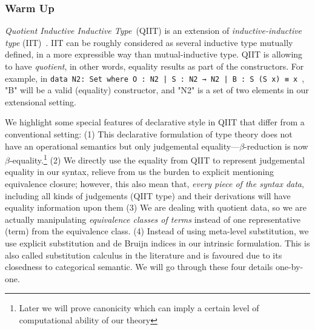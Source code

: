 
\subsubsection{Warm Up}
\textit{Quotient Inductive Inductive Type}~(QIIT) is an extension of \textit{inductive-inductive type} (IIT)~\cite{nordvall2010inductive}. IIT can be roughly considered as several inductive type mutually defined, in a more expressible way than mutual-inductive type. QIIT is allowing to have \textit{quotient}, in other words, equality results as part of the constructors. For example, in \texttt{data N2: Set where O : N2 | S : N2 → N2 | B : S (S x) ≡ x }, "B" will be a valid (equality) constructor, and "N2" is a set of two elements in our extensional setting.

We highlight some special features of declarative style in QIIT that differ from a
conventional setting: 
(1) This declarative formulation of type theory does not
have an operational semantics but only judgemental equality---$\beta$-reduction is now $\beta$-equality.\footnote{Later we will prove
canonicity which can imply a certain level of computational ability of
our theory} 
(2) We directly use the equality from QIIT to represent judgemental equality in our syntax, relieve from us the burden to explicit mentioning equivalence closure; however, this also mean that, \textit{every piece of the syntax data}, including all kinds of judgements (QIIT type) and their derivations will have equality information upon them  
(3) We are dealing with quotient data, so we are actually manipulating
\textit{equivalence classes of terms} instead of one representative (term) from the equivalence class.
(4) Instead of using meta-level substitution, we use explicit
substitution and de Bruijn indices in our intrinsic formulation. This is
also called substitution calculus in the literature and is favoured due
to its closedness to categorical semantic. We will go through these four details one-by-one.

